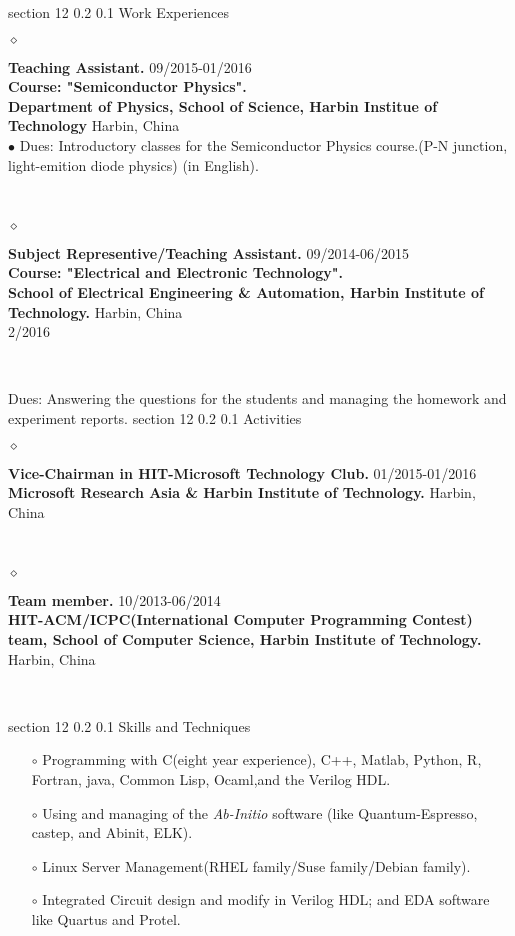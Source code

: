 \documentclass[a4paper]{article}
\makeatletter
\renewcommand{\section}{\@startsection  
{section}  
{12}  
{\z@}  
{0.2\baselineskip}  
{0.1\baselineskip}  
{\normalfont\large\scshape\bfseries}}
\newcommand{\dline} {\vspace{-0.3cm}
\noindent\hrulefill 

}
\newcommand{\entry}[5]
{
	\noindent
	$\diamond$ \parbox[t]{\textwidth}
	{
		 \textbf{{#2}} \small
		 \hfill #1
		 \\ \textbf{#3} \hfill {#4}
	\\#5
	}\\ \normalsize  
}
\makeatother
\begin{document}
\section{Work Experiences}
\dline
\entry
{09/2015-01/2016}
{Teaching Assistant.}
{Course: "Semiconductor Physics".\\ Department of Physics, School of Science, Harbin Institue of Technology}
{Harbin, China}
{$\bullet$ Dues: Introductory classes for the Semiconductor Physics course.(P-N junction, light-emition diode physics) (in English).}
\entry
{09/2014-06/2015}
{Subject Representive/Teaching Assistant.}
{Course: "Electrical and Electronic Technology".\\ School of Electrical Engineering \& Automation, Harbin Institute of Technology.}
{Harbin, China}
{2/2016}
{Dues: Answering the questions for the students and managing the homework and experiment reports.}
\section{Activities}
\dline
\entry
 {01/2015-01/2016}
 {Vice-Chairman in HIT-Microsoft Technology Club.} {Microsoft Research Asia \& Harbin Institute of Technology.}
 {Harbin, China}
 {}
\entry
 {10/2013-06/2014}
 {Team member.}
 {HIT-ACM/ICPC(International Computer Programming Contest) team, School of Computer Science, Harbin Institute of Technology. }
 {Harbin, China}
 {}

\section{Skills and Techniques}
\dline
\small
\begin{itemize}
\item[$\circ$]Programming with C(eight year experience), C++, Matlab, Python, R, Fortran, java, Common Lisp, Ocaml,and the Verilog HDL.
\item[$\circ$]Using and managing of the \emph{Ab-Initio} software (like Quantum-Espresso, castep, and Abinit, ELK).
\item[$\circ$]Linux Server Management(RHEL family/Suse family/Debian family).
\item[$\circ$]Integrated Circuit design and modify in Verilog HDL; and EDA software like Quartus and Protel.
\end{itemize}
\normalsize
\end{document}
